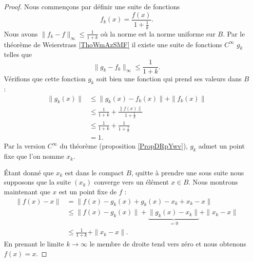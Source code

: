 \begin{proof}
    Nous commençons par définir une suite de fonctions
    \begin{equation}
        f_k(x)=\frac{ f(x) }{ 1+\frac{1}{ k } }.
    \end{equation}
    Nous avons \( \| f_k-f \|_{\infty}\leq \frac{1}{ 1+k }\) où la norme est la norme uniforme sur \( B\). Par le théorème de Weierstrass \ref{ThoWmAzSMF} il existe une suite de fonctions \(  C^{\infty}\) \( g_k\) telles que
    \begin{equation}
        \|  g_k-f_k\|_{\infty}\leq\frac{1}{ 1+k }.
    \end{equation}
    Vérifions que cette fonction \( g_k\) soit bien une fonction qui prend ses valeurs dans \( B\) :
    \begin{subequations}
        \begin{align}
            \| g_k(x) \|&\leq \| g_k(x)-f_k(x) \|+\| f_k(x) \|\\
            &\leq \frac{1}{ 1+k }+\frac{ \| f(x) \| }{ 1+\frac{1}{ k } }\\
            &\leq \frac{1}{ 1+k}+\frac{1}{ 1+\frac{1}{ k } }\\
            &=1.
        \end{align}
    \end{subequations}
    Par la version \(  C^{\infty}\) du théorème (proposition \ref{PropDRpYwv}), \( g_k\) admet un point fixe que l'on nomme \( x_k\).

    Étant donné que \( x_k\) est dans le compact \( B\), quitte à prendre une sous suite nous supposons que la suite \( (x_k)\) converge vers un élément \( x\in B\). Nous montrons maintenant que \( x\) est un point fixe de \( f\) :
    \begin{subequations}
        \begin{align}
            \| f(x)-x \|&=\| f(x)-g_k(x)+g_k(x)-x_k+x_k-x \|\\
            &\leq \| f(x)-g_k(x) \| +\underbrace{\| g_k(x)-x_k \|}_{=0}+\| x_k-x \|\\
            &\leq \frac{1}{ 1+k }+\| x_k-x \|.
        \end{align}
    \end{subequations}
    En prenant le limite \( k\to\infty\) le membre de droite tend vers zéro et nous obtenons \( f(x)=x\).
\end{proof}

